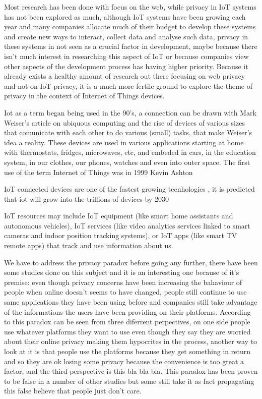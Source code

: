 \documentclass[conference]{IEEEtran}
\begin{document}
Most research has been done with focus on the web, while privacy in IoT
systems has not been explored as much, although IoT systems have been
growing each year and many companies allocate much of their budget to
develop these systems and create new ways to interact, collect data and
analyse such data, privacy in these systems in not seen as a crucial
factor in development, maybe because there isn't much
interest in researching this aspect of IoT or because companies view other
aspects of the development process has having higher priority.
Because it already exists a healthy amount of research out there
focusing on web privacy and not on IoT privacy, it is a much more
fertile ground to explore the theme of privacy in the context of
Internet of Things devices.

Iot as a term began being used in the 90's, a connection can be drawn
with Mark Weiser's article on ubiquous computing and the rise
of devices of various sizes that comunicate with each other to do
various (small) tasks, that make Weiser's idea a reality. These devices are
used in various applications starting at home with thermostats,
fridges, microwaves, etc, and embeded in cars, in the education system,
in our clothes, our phones, watches and even into outer space. The
first use of the term Internet of Things was in 1999  Kevin Ashton

IoT connected devices are one of the fastest growing tecnhologies \cite{MohammadState},
it is predicted that iot will grow into the trillions of devices by 2030 \cite{SarawiInternet}

IoT resources may include IoT equipment (like smart home assistants and
autonomous vehicles), IoT services (like video analytics services linked to
smart cameras and indoor position tracking systems), or IoT apps
(like smart TV remote apps) that track and use information about us.

We have to address the privacy paradox before going any further, there have been some studies
done on this subject and it is an interesting one because of it's premise:
even though privacy concerns have been increasing the bahaviour of people
when online doesn't seems to have changed, people still continue to use same
applications they have been using before and companies still take
advantage of the informations the users have been providing on their
platforms. According to \cite{} this paradox can be seen from three diferrent
perpectives, on one side people use whatever platforms they want to use
even though they say they are worried about their online privacy making them
hypocrites in the process, another way to look at it is that people use
the platforms because they get something in return and so they
are ok losing some privacy because the convenience is too great a factor, and 
the third perspective is this bla bla bla. This paradox has been proven
to be false in a number of other studies but some still take it as fact 
propagating this false believe that people just don't care.
\end{document}
